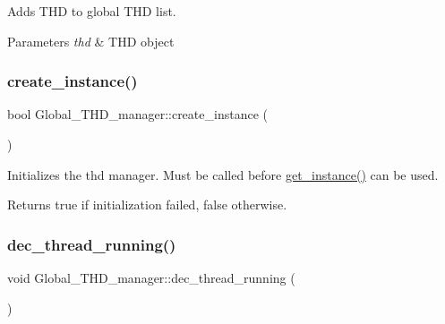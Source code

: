 Adds T\+HD to global T\+HD list.


\begin{DoxyParams}{Parameters}
{\em thd} & T\+HD object \\
\hline
\end{DoxyParams}
\mbox{\label{classGlobal__THD__manager_adde98689c7a71d9adf1284d89cab8776}} 
\subsubsection{\texorpdfstring{create\+\_\+instance()}{create\_instance()}}
{\footnotesize\ttfamily bool Global\+\_\+\+T\+H\+D\+\_\+manager\+::create\+\_\+instance (\begin{DoxyParamCaption}{ }\end{DoxyParamCaption})\hspace{0.3cm}{\ttfamily [static]}}

Initializes the thd manager. Must be called before \mbox{\hyperlink{classGlobal__THD__manager_a5e4a050bfded837c0faf11f11f83557e}{get\+\_\+instance()}} can be used.

\begin{DoxyReturn}{Returns}
true if initialization failed, false otherwise. 
\end{DoxyReturn}
\mbox{\label{classGlobal__THD__manager_a842edf9553aaf1a228b996299252273a}} 
\subsubsection{\texorpdfstring{dec\+\_\+thread\+\_\+running()}{dec\_thread\_running()}}
{\footnotesize\ttfamily void Global\+\_\+\+T\+H\+D\+\_\+manager\+::dec\+\_\+thread\+\_\+running (\begin{DoxyParamCaption}{ }\end{DoxyParamCaption})\hspace{0.3cm}{\ttfamily [inline]}}

